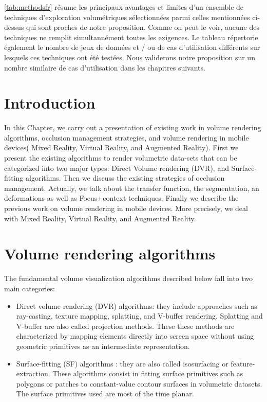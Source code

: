 \autoref{tab:methodsfr} résume les principaux avantages et limites d'un ensemble de techniques d'exploration volumétriques sélectionnées parmi celles mentionnées ci-dessus qui sont proches de notre proposition. Comme on peut le voir, aucune des techniques ne remplit simultannément  toutes les exigences. Le tableau répertorie également le nombre de jeux de données et / ou de cas d'utilisation différents sur lesquels ces techniques ont été testées. Nous validerons notre proposition sur un nombre similaire de cas d'utilisation dans les chapitres suivants.



\section{Introduction}

In this Chapter, we carry out a presentation of existing work in volume rendering algorithms, occlusion management strategies, and volume rendering in mobile devices( Mixed Reality, Virtual Reality, and Augmented Reality). First we present the existing algorithms to render volumetric data-sets that can be categorized into two major types: Direct Volume rendering (DVR), and Surface-fitting algorithms. Then we discuss the existing strategies of occlusion management. Actually, we talk about the transfer function, the segmentation, an deformations as well as Focus+context techniques. Finally we  describe the previous work on  volume rendering in mobile devices. More precisely, we deal with Mixed Reality, Virtual Reality, and Augmented Reality.



\section{Volume rendering algorithms}

The fundamental volume visualization algorithms described
below fall into two main categories: 

\begin{itemize}

\item Direct volume rendering (DVR) algorithms: they include approaches such as ray-casting, texture mapping, splatting, and V-buffer rendering. Splatting and V-buffer are also called projection methods. These these methods are characterized by mapping elements directly into screen space without using geometric primitives as an intermediate representation.

\item Surface-fitting (SF) algorithms : they are also called isosurfacing or feature-extraction. These algorithms consist in fitting surface primitives such as
polygons or patches to constant-value contour surfaces in volumetric datasets. The surface primitives used are most of the time planar.

\end{itemize}

